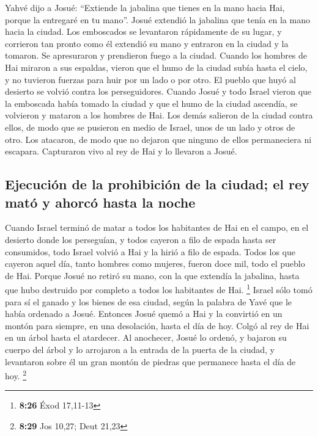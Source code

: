 Yahvé dijo a Josué: ``Extiende la jabalina que tienes en
la mano hacia Hai, porque la entregaré en tu mano''. Josué extendió la
jabalina que tenía en la mano hacia la ciudad.  Los
emboscados se levantaron rápidamente de su lugar, y corrieron tan pronto
como él extendió su mano y entraron en la ciudad y la tomaron. Se
apresuraron y prendieron fuego a la ciudad.  Cuando los
hombres de Hai miraron a sus espaldas, vieron que el humo de la ciudad
subía hasta el cielo, y no tuvieron fuerzas para huir por un lado o por
otro. El pueblo que huyó al desierto se volvió contra los perseguidores.
 Cuando Josué y todo Israel vieron que la emboscada había
tomado la ciudad y que el humo de la ciudad ascendía, se volvieron y
mataron a los hombres de Hai.  Los demás salieron de la
ciudad contra ellos, de modo que se pusieron en medio de Israel, unos de
un lado y otros de otro. Los atacaron, de modo que no dejaron que
ninguno de ellos permaneciera ni escapara.  Capturaron
vivo al rey de Hai y lo llevaron a Josué.

\hypertarget{ejecuciuxf3n-de-la-prohibiciuxf3n-de-la-ciudad-el-rey-matuxf3-y-ahorcuxf3-hasta-la-noche}{%
\subsection{Ejecución de la prohibición de la ciudad; el rey mató y
ahorcó hasta la
noche}\label{ejecuciuxf3n-de-la-prohibiciuxf3n-de-la-ciudad-el-rey-matuxf3-y-ahorcuxf3-hasta-la-noche}}

 Cuando Israel terminó de matar a todos los habitantes de
Hai en el campo, en el desierto donde los perseguían, y todos cayeron a
filo de espada hasta ser consumidos, todo Israel volvió a Hai y la hirió
a filo de espada.  Todos los que cayeron aquel día, tanto
hombres como mujeres, fueron doce mil, todo el pueblo de Hai.
 Porque Josué no retiró su mano, con la que extendía la
jabalina, hasta que hubo destruido por completo a todos los habitantes
de Hai. \footnote{\textbf{8:26} Éxod 17,11-13}  Israel
sólo tomó para sí el ganado y los bienes de esa ciudad, según la palabra
de Yavé que le había ordenado a Josué.  Entonces Josué
quemó a Hai y la convirtió en un montón para siempre, en una desolación,
hasta el día de hoy.  Colgó al rey de Hai en un árbol
hasta el atardecer. Al anochecer, Josué lo ordenó, y bajaron su cuerpo
del árbol y lo arrojaron a la entrada de la puerta de la ciudad, y
levantaron sobre él un gran montón de piedras que permanece hasta el día
de hoy. \footnote{\textbf{8:29} Jos 10,27; Deut 21,23}

